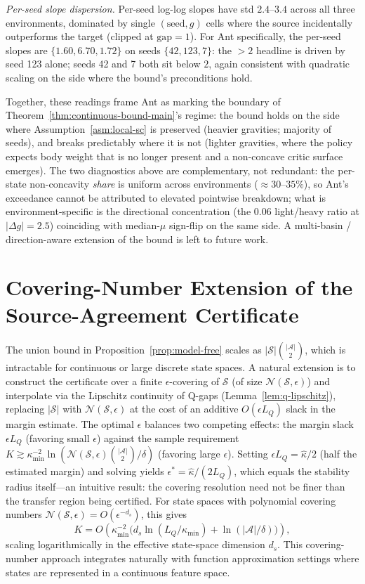 \documentclass{article}
\newcommand{\cS}{\mathcal{S}}
\newcommand{\cA}{\mathcal{A}}
\newcommand{\cN}{\mathcal{N}}
\begin{document}
\emph{Per-seed slope dispersion.} Per-seed log-log slopes have std $2.4$--$3.4$ across all three environments, dominated by single $(\text{seed}, g)$ cells where the source incidentally outperforms the target (clipped at $\mathrm{gap}=1$). For Ant specifically, the per-seed slopes are $\{1.60, 6.70, 1.72\}$ on seeds $\{42, 123, 7\}$: the $> 2$ headline is driven by seed 123 alone; seeds 42 and 7 both sit below $2$, again consistent with quadratic scaling on the side where the bound's preconditions hold.

Together, these readings frame Ant as marking the boundary of Theorem~\ref{thm:continuous-bound-main}'s regime: the bound holds on the side where Assumption~\ref{asm:local-sc} is preserved (heavier gravities; majority of seeds), and breaks predictably where it is not (lighter gravities, where the policy expects body weight that is no longer present and a non-concave critic surface emerges). The two diagnostics above are complementary, not redundant: the per-state non-concavity \emph{share} is uniform across environments ($\approx 30$--$35\%$), so Ant's exceedance cannot be attributed to elevated pointwise breakdown; what is environment-specific is the directional concentration (the $0.06$ light/heavy ratio at $|\Delta g|=2.5$) coinciding with median-$\mu$ sign-flip on the same side. A multi-basin / direction-aware extension of the bound is left to future work.

\section{Covering-Number Extension of the Source-Agreement Certificate}
\label{app:covering-number}

The union bound in Proposition~\ref{prop:model-free} scales as $|\cS|\binom{|\cA|}{2}$, which is intractable for continuous or large discrete state spaces. A natural extension is to construct the certificate over a finite $\epsilon$-covering of $\cS$ (of size $\cN(\cS, \epsilon)$) and interpolate via the Lipschitz continuity of Q-gaps (Lemma~\ref{lem:q-lipschitz}), replacing $|\cS|$ with $\cN(\cS, \epsilon)$ at the cost of an additive $O(\epsilon L_Q)$ slack in the margin estimate.
The optimal $\epsilon$ balances two competing effects: the margin slack $\epsilon L_Q$ (favoring small $\epsilon$) against the sample requirement $K \gtrsim \kappa_{\min}^{-2}\ln(\cN(\cS,\epsilon)\binom{|\cA|}{2}/\delta)$ (favoring large $\epsilon$). Setting $\epsilon L_Q = \hat{\kappa}/2$ (half the estimated margin) and solving yields $\epsilon^* = \hat{\kappa}/(2L_Q)$, which equals the stability radius itself---an intuitive result: the covering resolution need not be finer than the transfer region being certified.
For state spaces with polynomial covering numbers $\cN(\cS, \epsilon) = O(\epsilon^{-d_s})$, this gives
\[
K = O\!\left(\kappa_{\min}^{-2}\bigl(d_s\ln(L_Q/\kappa_{\min}) + \ln(|\cA|/\delta)\bigr)\right),
\]
scaling logarithmically in the effective state-space dimension $d_s$. This covering-number approach integrates naturally with function approximation settings where states are represented in a continuous feature space.
\end{document}
